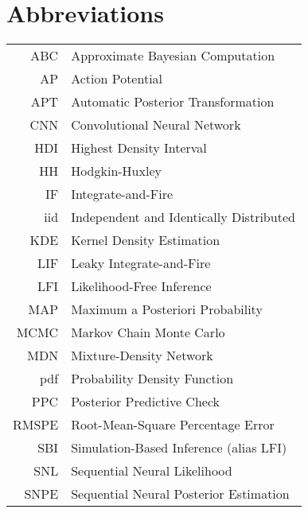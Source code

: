 \chapter*{Abbreviations}
\thispagestyle{plain}



\begin{longtable}{rl}
    ABC & Approximate Bayesian Computation \\
    AP & Action Potential \\
    APT & Automatic Posterior Transformation \\
    CNN & Convolutional Neural Network \\
    HDI & Highest Density Interval \\
    HH & Hodgkin-Huxley \\
    IF & Integrate-and-Fire \\
    iid & Independent and Identically Distributed \\
    KDE & Kernel Density Estimation \\
    LIF & Leaky Integrate-and-Fire \\
    LFI & Likelihood-Free Inference \\
    MAP &  Maximum a Posteriori Probability \\
    MCMC & Markov Chain Monte Carlo \\
    MDN & Mixture-Density Network \\
    pdf & Probability Density Function \\
    PPC & Posterior Predictive Check \\
    RMSPE & Root-Mean-Square Percentage Error \\
    SBI & Simulation-Based Inference (alias LFI) \\
    SNL & Sequential Neural Likelihood \\
    SNPE & Sequential Neural Posterior Estimation \\
\end{longtable}

